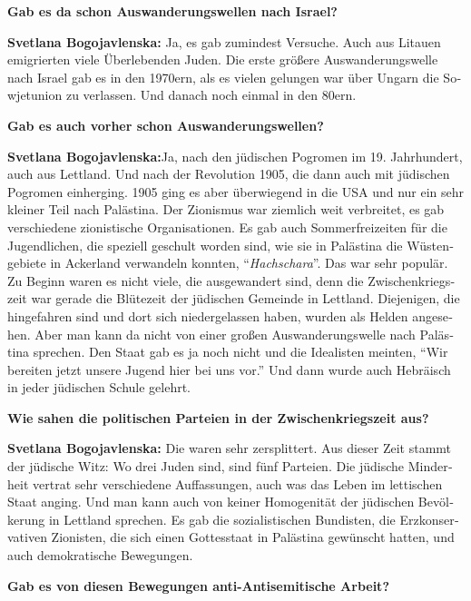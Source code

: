 \begin{otherlanguage}{ngerman}
\textbf{Gab es da schon Auswanderungswellen nach Israel?}

\textbf{Svetlana Bogojavlenska:} Ja, es gab zumindest Versuche. Auch aus Litauen emigrierten viele Überlebenden Juden. Die erste größere Auswanderungswelle nach Israel gab es in den 1970ern, als es vielen gelungen war über Ungarn die Sowjetunion zu verlassen. Und danach noch einmal in den 80ern. 

\textbf{Gab es auch vorher schon Auswanderungswellen?}

\textbf{Svetlana Bogojavlenska:}Ja, nach den jüdischen Pogromen im 19. Jahrhundert, auch aus Lettland. Und nach der Revolution 1905, die dann auch mit jüdischen Pogromen einherging. 1905 ging es aber überwiegend in die USA und nur ein sehr kleiner Teil nach Palästina. Der Zionismus war ziemlich weit verbreitet, es gab verschiedene zionistische Organisationen. Es gab auch Sommerfreizeiten für die Jugendlichen, die speziell geschult worden sind, wie sie in Palästina die Wüstengebiete in Ackerland verwandeln konnten, "`\textit{Hachschara}"'. Das war sehr populär. Zu Beginn waren es nicht viele, die ausgewandert sind, denn die Zwischenkriegszeit war gerade die Blütezeit der jüdischen Gemeinde in Lettland. Diejenigen, die hingefahren sind und dort sich niedergelassen haben, wurden als Helden angesehen. Aber man kann da nicht von einer großen Auswanderungswelle nach Palästina sprechen. Den Staat gab es ja noch nicht und die Idealisten meinten, "`Wir bereiten jetzt unsere Jugend hier bei uns vor."' Und dann wurde auch Hebräisch in jeder jüdischen Schule gelehrt.

\textbf{Wie sahen die politischen Parteien in der Zwischenkriegszeit aus?}

\textbf{Svetlana Bogojavlenska:}  Die waren sehr zersplittert. Aus dieser Zeit stammt der jüdische Witz: Wo drei Juden sind, sind fünf Parteien. Die jüdische Minderheit vertrat sehr verschiedene Auffassungen, auch was das Leben im lettischen Staat anging. Und man kann auch von keiner Homogenität der jüdischen Bevölkerung in Lettland sprechen. Es gab die sozialistischen Bundisten, die Erzkonservativen Zionisten, die sich einen Gottesstaat in Palästina gewünscht hatten, und auch demokratische Bewegungen.

\textbf{Gab es von diesen Bewegungen anti-Antisemitische Arbeit?}


\end{otherlanguage}
